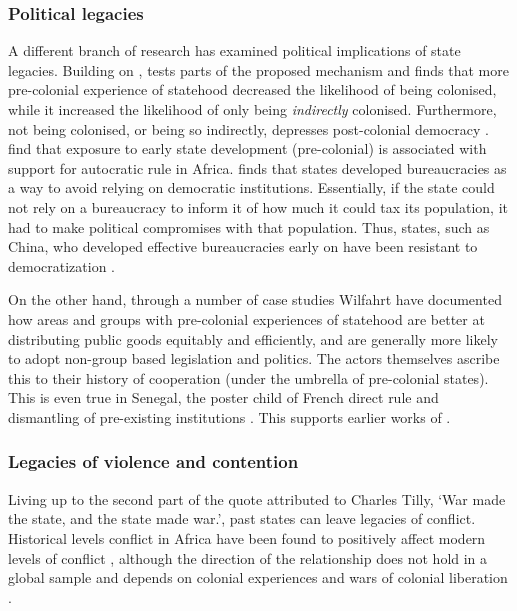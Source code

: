 \subsubsection{Political legacies} \label{Political legacies}

A different branch of research has examined political implications of state
legacies. Building on \citet{Acemoglu_2002}, \citet{Hariri2012} tests parts of
the proposed mechanism and finds that more pre-colonial experience of statehood
decreased the likelihood of being colonised, while it increased the likelihood
of only being \textit{indirectly} colonised. Furthermore, not being colonised,
or being so indirectly, depresses post-colonial democracy \citep{Hariri2012}.
\citet{Chlouba_2021} find that exposure to early state development
(pre-colonial) is associated with support for autocratic rule in Africa.
\citet{StasavageDavid2020Tdar} finds that states developed bureaucracies as a way
to avoid relying on democratic institutions. Essentially, if the state could not
rely on a bureaucracy to inform it of how much it could tax its population, it
had to make political compromises with that population. Thus, states, such as
China, who developed effective bureaucracies early on have been resistant to
democratization \citep{StasavageDavid2020Tdar}.	 

On the other hand, through a number of case studies Wilfahrt
\citeyear{Wilfahrt2018, Wilfahrt_2021} have documented how areas and groups with
pre-colonial experiences of statehood are better at distributing public goods
equitably and efficiently, and are generally more likely to adopt non-group
based legislation and politics. The actors themselves ascribe this to their
history of cooperation (under the umbrella of pre-colonial states). This is even
true in Senegal, the poster child of French direct rule and dismantling of
pre-existing institutions \citep{Wilfahrt_2021}. This supports earlier works of
\citet{Gennaioli_2007, Gennaioli2007a}.

\subsubsection{Legacies of violence and contention} 
\label{Legacies of violence and contention}

Living up to the second part of the quote attributed to Charles Tilly, `War
made the state, and the state made war.', past states can leave legacies of
conflict. Historical levels conflict in Africa have been found to positively
affect modern levels of conflict \citep{Besley2014}, although the direction of
the relationship does not hold in a global sample and depends on colonial
experiences and wars of colonial liberation \citep{Fearon2014}. 

